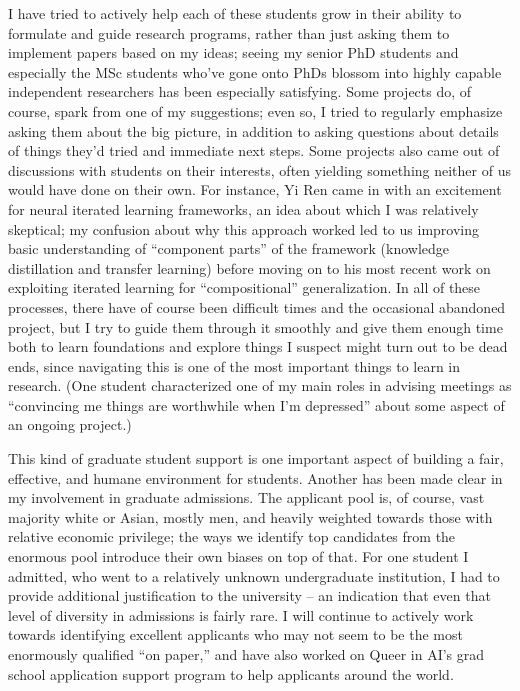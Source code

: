 \documentclass[12pt]{article}
\begin{document}

I have tried to actively help each of these students grow in their ability to formulate and guide research programs,
rather than just asking them to implement papers based on my ideas;
seeing my senior PhD students and especially the MSc students who've gone onto PhDs
blossom into highly capable independent researchers has been especially satisfying.
Some projects do, of course, spark from one of my suggestions;
even so, I tried to regularly emphasize asking them about the big picture,
in addition to asking questions about details of things they'd tried and immediate next steps.
Some projects also came out of discussions with students on their interests,
often %
yielding something neither of us would have done on their own.
For instance, Yi Ren came in with an excitement for neural iterated learning frameworks,
an idea about which I was relatively skeptical;
my confusion about why this approach worked
led to us improving basic understanding of ``component parts'' of the framework
(knowledge distillation and transfer learning)
before moving on to his most recent work on exploiting iterated learning for ``compositional'' generalization.
In all of these processes,
there have of course been difficult times and the occasional abandoned project,
but I try to guide them through it smoothly
and give them enough time both to learn foundations and explore things I suspect might turn out to be dead ends,
since navigating this is one of the most important things to learn in research.
(One student characterized one of my main roles in advising meetings as ``convincing me things are worthwhile when I'm depressed'' about some aspect of an ongoing project.)

This kind of graduate student support is one important aspect of building a fair, effective, and humane environment for students. Another has been made clear in my involvement in graduate admissions. The applicant pool is, of course, vast majority white or Asian, mostly men, and heavily weighted towards those with relative economic privilege; the ways we identify top candidates from the enormous pool introduce their own biases on top of that. For one student I admitted, who went to a relatively unknown undergraduate institution, I had to provide additional justification to the university -- an indication that even that level of diversity in admissions is fairly rare. I will continue to actively work towards identifying excellent applicants who may not seem to be the most enormously qualified ``on paper,''
and have also worked on Queer in AI's grad school application support program to help applicants around the world.
\end{document}
